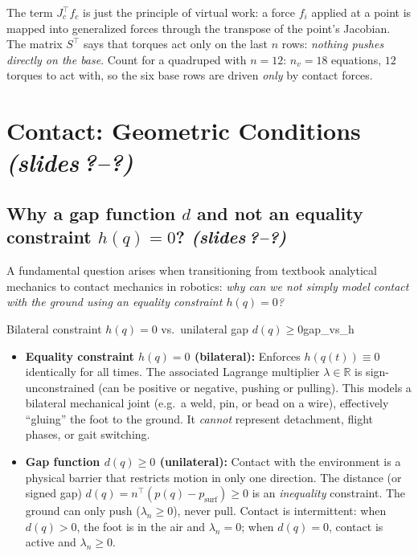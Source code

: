 \documentclass[11pt,a4paper]{article}
\newcommand{\R}{\mathbb{R}}
\newcommand{\sr}{\emph{(slides\,?--?)}}
\newcommand{\Jc}{J_c}
\begin{document}
\begin{intuition}
The term $\Jc^\top f_c$ is just the principle of virtual work: a force $f_i$ applied at a
point is mapped into generalized forces through the transpose of the point's Jacobian.
The matrix $S^\top$ says that torques act only on the last $n$ rows: \emph{nothing pushes
directly on the base}. Count for a quadruped with $n=12$: $n_v=18$ equations, $12$ torques
to act with, so the six base rows are driven \emph{only} by contact forces.
\end{intuition}

\section{Contact: Geometric Conditions \sr}\label{sec:geom}

\subsection{Why a gap function $d$ and not an equality constraint $h(q)=0$? \sr}

A fundamental question arises when transitioning from textbook analytical mechanics to contact mechanics in robotics: \emph{why can we not simply model contact with the ground using an equality constraint $h(q)=0$?}

\begin{proposition}{Bilateral constraint $h(q)=0$ vs.\ unilateral gap $d(q)\ge 0$}{gap_vs_h}
\begin{itemize}[nosep]
  \item \textbf{Equality constraint $h(q)=0$ (bilateral):}
  Enforces $h(q(t))\equiv 0$ identically for all times. The associated Lagrange multiplier $\lambda \in \R$ is sign-unconstrained (can be positive or negative, pushing or pulling). This models a bilateral mechanical joint (e.g.\ a weld, pin, or bead on a wire), effectively ``gluing'' the foot to the ground. It \emph{cannot} represent detachment, flight phases, or gait switching.
  \item \textbf{Gap function $d(q)\ge 0$ (unilateral):}
  Contact with the environment is a physical barrier that restricts motion in only one direction. The distance (or signed gap) $d(q) = n^\top(p(q)-p_{\text{surf}}) \ge 0$ is an \emph{inequality} constraint. The ground can only push ($\lambda_n \ge 0$), never pull. Contact is intermittent: when $d(q)>0$, the foot is in the air and $\lambda_n=0$; when $d(q)=0$, contact is active and $\lambda_n\ge 0$.
\end{itemize}
\end{proposition}
\end{document}
